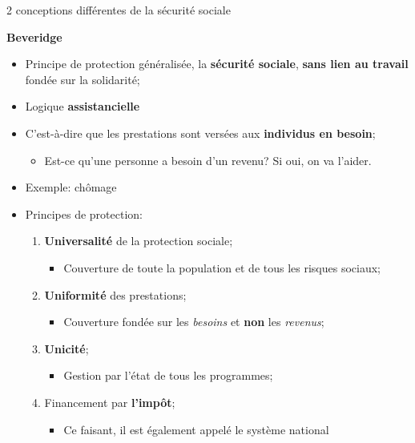 \documentclass[10pt, french]{article}
\begin{document}
\begin{multicols*}{3}
\begin{conceptgen}{2 conceptions différentes de la sécurité sociale}
\begin{center}
\textbf{Beveridge}
\end{center}
\begin{itemize}[leftmargin = *]
	\item	Principe de protection généralisée, la \textbf{sécurité sociale}, \textbf{sans lien au travail} fondée sur la solidarité;
	\item	Logique \textbf{assistancielle}
	\item[]	C'est-à-dire que les prestations sont versées aux \textbf{individus en besoin};
		\begin{itemize}
		\item	Est-ce qu'une personne a besoin d'un revenu? Si oui, on va l'aider.
		\end{itemize}
	\item	Exemple: chômage
	\item	Principes de protection:
		\begin{enumerate}
		\item	\textbf{Universalité} de la protection sociale;
			\begin{itemize}
			\item	Couverture de toute la population et de tous les risques sociaux;
			\end{itemize}
		\item	\textbf{Uniformité} des prestations;
			\begin{itemize}
			\item	Couverture fondée sur les \textit{besoins} et \textbf{non} les \textit{revenus};
			\end{itemize}
		\item	\textbf{Unicité};
			\begin{itemize}
			\item	Gestion par l'état de tous les programmes;
			\end{itemize}	
		\item	Financement par \textbf{l'impôt};
			\begin{itemize}
			\item	Ce faisant, il est également appelé le système \og national \fg{} 
			\end{itemize}
		\end{enumerate}
\end{itemize}
\end{conceptgen}


\end{multicols*}
\end{document}
